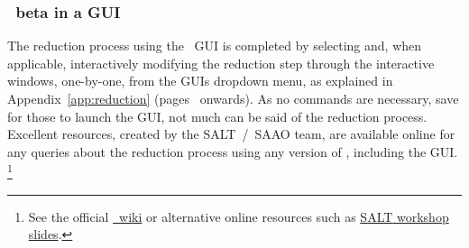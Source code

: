 \subsubsection{\polsalt\ beta in a \gls{GUI}}

The reduction process using the \polsalt\ \gls{GUI} is completed by selecting and, when applicable, interactively modifying the reduction step through the interactive windows, one-by-one, from the \glspl{GUI} dropdown menu, as explained in Appendix~\ref{app:reduction} (pages~\pageref{code:stops_corr} onwards). As no commands are necessary, save for those to launch the \gls{GUI}, not much can be said of the reduction process. Excellent resources, created by the \gls{SALT}~/~\gls{SAAO} team, are available online for any queries about the reduction process using any version of \polsalt, including the \gls{GUI}.%
\footnote{See the official \href{https://github.com/saltastro/polsalt/wiki}{\polsalt\ wiki} or alternative online resources such as \href{https://saltworkshop2022.salt.ac.za/wp-content/uploads/2022/11/DG_polsalt_SALT_workshop_2022_finalversion.pdf}{\gls{SALT} workshop slides}.}




